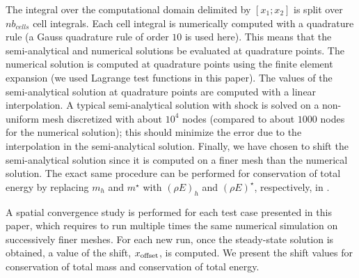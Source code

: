 \documentclass[times,doublespace]{fldauth}%
\begin{document}
The integral over the computational domain delimited by $[x_1; x_2]$ is split over $nb_{cells}$ cell integrals. Each cell integral is numerically computed with a quadrature rule (a Gauss quadrature rule of order $10$ is used here). This means that the semi-analytical and numerical solutions be evaluated at quadrature points. The numerical solution is computed at quadrature points using the finite element expansion (we used Lagrange test functions in this paper). The values of the semi-analytical solution at quadrature points are computed with a linear interpolation.
A typical semi-analytical solution with shock is solved on a non-uniform mesh discretized with about $10^4$ nodes (compared to about $1000$ nodes for the numerical solution); this should minimize the error due to the interpolation in the semi-analytical solution. Finally, we have chosen to shift the semi-analytical solution since it is computed on a finer mesh than the numerical solution. The exact same procedure can be performed for conservation of total energy by replacing $m_h$ and $m^\star$ with $(\rho E)_h$ and $(\rho E)^\star$, respectively, in .

A spatial convergence study is performed for each test case presented in this paper, which requires to run multiple times the same numerical simulation on successively finer meshes. For each new run, once the steady-state solution is obtained, a value of the shift, $x_{\text{\text{offset}}}$, is computed. We present the shift values for conservation of total mass and conservation of
total energy.
%
\end{document}
